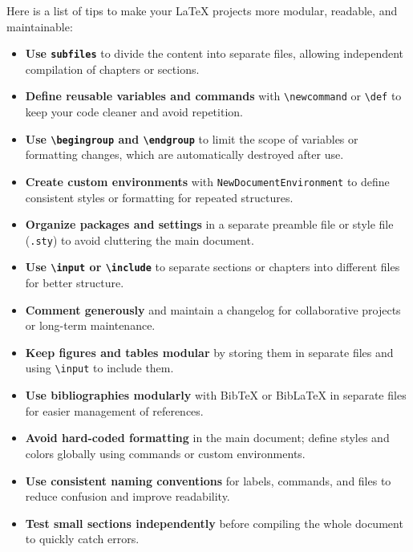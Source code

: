 \documentclass[../../main.tex]{subfiles}
\begin{document}
Here is a list of tips to make your LaTeX projects more modular, readable, and maintainable:

\begin{itemize}
    \item \textbf{Use \texttt{subfiles}} to divide the content into separate files, allowing independent compilation of chapters or sections.
    
    \item \textbf{Define reusable variables and commands} with \texttt{\textbackslash newcommand} or \texttt{\textbackslash def} to keep your code cleaner and avoid repetition.
    
    \item \textbf{Use \texttt{\textbackslash begingroup} and \texttt{\textbackslash endgroup}} to limit the scope of variables or formatting changes, which are automatically destroyed after use.
    
    \item \textbf{Create custom environments} with \texttt{NewDocumentEnvironment} to define consistent styles or formatting for repeated structures.
    
    \item \textbf{Organize packages and settings} in a separate preamble file or style file (\texttt{.sty}) to avoid cluttering the main document.
    
    \item \textbf{Use \texttt{\textbackslash input} or \texttt{\textbackslash include}} to separate sections or chapters into different files for better structure.
    
    \item \textbf{Comment generously} and maintain a changelog for collaborative projects or long-term maintenance.
    
    \item \textbf{Keep figures and tables modular} by storing them in separate files and using \texttt{\textbackslash input} to include them.
    
    \item \textbf{Use bibliographies modularly} with BibTeX or BibLaTeX in separate files for easier management of references.
    
    \item \textbf{Avoid hard-coded formatting} in the main document; define styles and colors globally using commands or custom environments.
    
    \item \textbf{Use consistent naming conventions} for labels, commands, and files to reduce confusion and improve readability.
    
    \item \textbf{Test small sections independently} before compiling the whole document to quickly catch errors.
\end{itemize}

\clearpage
\end{document}
